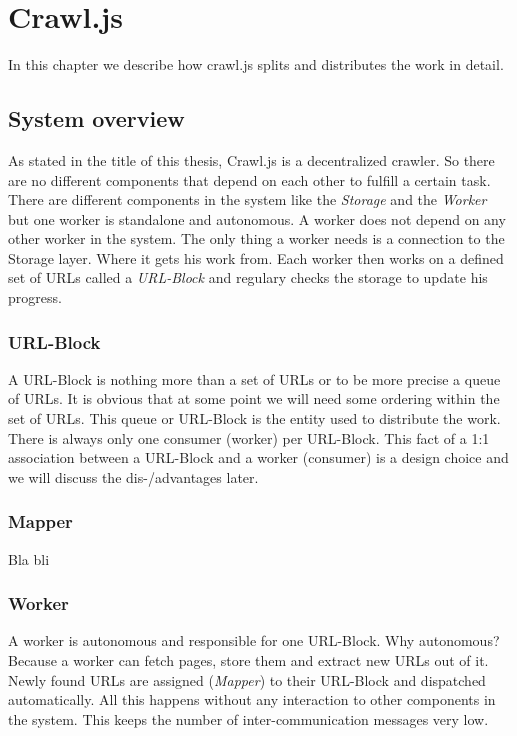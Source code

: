 
\chapter{Crawl.js} %
In this chapter we describe how crawl.js splits and distributes the work in detail.
\label{Chapter4} 

\section{System overview}
As stated in the title of this thesis, Crawl.js is a decentralized crawler. So there are no different components that depend on each other to fulfill a certain task. There are different components in the system like the \emph{Storage} and the \emph{Worker} but one worker is standalone and autonomous. A worker does not depend on any other worker in the system. The only thing a worker needs is a connection to the Storage layer. Where it gets his work from.
Each worker then works on a defined set of URLs called a \emph{URL-Block} and regulary checks the storage to update his progress.

\subsection{URL-Block}
A URL-Block is nothing more than a set of URLs or to be more precise a queue of URLs. It is obvious that at some point we will need some ordering within the set of URLs.
This queue or URL-Block is the entity used to distribute the work. There is always only one consumer (worker) per URL-Block.
This fact of a 1:1 association between a URL-Block and a worker (consumer) is a design choice and we will discuss the dis-/advantages later.

\subsection{Mapper}
Bla bli

\subsection{Worker}
A worker is autonomous and responsible for one URL-Block. Why autonomous? Because a worker can fetch pages, store them and extract new URLs out of it. Newly found URLs are assigned (\emph{Mapper}) to their URL-Block and dispatched automatically. All this happens without any interaction to other components in the system. This keeps the number of inter-communication messages very low.

